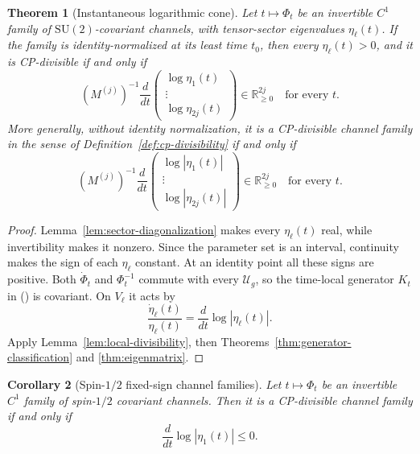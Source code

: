 \documentclass[twoside,10pt]{article}
\numberwithin{equation}{section}
\theoremstyle{slbody}
\newtheorem{theorem}{Theorem}[section]
\newtheorem{corollary}[theorem]{Corollary}
\theoremstyle{definition}
\theoremstyle{remark}
\newcommand{\SU}{\mathrm{SU}(2)}
\newcommand{\cU}{\mathcal U}
\newcommand{\Rplus}{\mathbb R_{\geq 0}}
\renewcommand{\eqref}[1]{%
  \textup{{\normalfont(\oldstylenums{\ref{#1}}}\normalfont)}}
\begin{document}
\begin{theorem}[Instantaneous logarithmic cone]
\label{thm:path-criterion}
Let \(t\mapsto\Phi_t\) be an invertible \(C^1\) family of
\(\SU\)-covariant channels, with tensor-sector eigenvalues
\(\eta_\ell(t)\).
If the family is identity-normalized at its least time \(t_0\), then every
\(\eta_\ell(t)>0\), and it is CP-divisible if and only if
\begin{equation}\label{eq:path-cone-identity}
 (M^{(j)})^{-1}\frac{d}{dt}
 \begin{pmatrix}
 \log\eta_1(t)\\ \vdots\\ \log\eta_{2j}(t)
 \end{pmatrix}
 \in\Rplus^{2j}
 \quad\text{for every }t.
\end{equation}
More generally, without identity normalization, it is a CP-divisible
channel family in the sense of Definition~\ref{def:cp-divisibility} if and
only if
\begin{equation}\label{eq:path-cone}
 (M^{(j)})^{-1}\frac{d}{dt}
 \begin{pmatrix}
 \log|\eta_1(t)|\\ \vdots\\ \log|\eta_{2j}(t)|
 \end{pmatrix}
 \in\Rplus^{2j}
 \quad\text{for every }t.
\end{equation}
\end{theorem}

\begin{proof}
Lemma~\ref{lem:sector-diagonalization} makes every \(\eta_\ell(t)\)
real, while invertibility makes it nonzero.  Since the parameter set is
an interval, continuity makes the sign of each \(\eta_\ell\) constant.
At an identity point all these signs are positive.
Both \(\dot\Phi_t\) and \(\Phi_t^{-1}\) commute with every
\(\cU_g\), so the time-local generator \(K_t\) in
\eqref{eq:time-local-generator} is covariant.  On \(V_\ell\) it acts
by
\begin{equation*}
 \frac{\dot\eta_\ell(t)}{\eta_\ell(t)}
 =\frac{d}{dt}\log|\eta_\ell(t)|.
\end{equation*}
Apply Lemma~\ref{lem:local-divisibility}, then
Theorems~\ref{thm:generator-classification} and
\ref{thm:eigenmatrix}.
\end{proof}

\begin{corollary}[Spin-\(1/2\) fixed-sign channel families]
\label{cor:negative-spectrum-paths}
Let \(t\mapsto\Phi_t\) be an invertible \(C^1\) family of spin-\(1/2\)
covariant channels.  Then it is a CP-divisible channel family if and only
if
\begin{equation*}
 \frac{d}{dt}\log|\eta_1(t)|\leq0.
\end{equation*}
\end{corollary}
\end{document}

